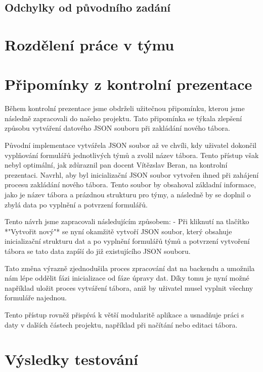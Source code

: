 \documentclass[a4paper, 12pt]{article} %
\begin{document}
\subsection{Odchylky od původního zadání}

\section{Rozdělení práce v týmu}

\section{Připomínky z kontrolní prezentace}

Během kontrolní prezentace jsme obdrželi užitečnou připomínku, kterou jsme následně 
zapracovali do našeho projektu. Tato připomínka se týkala zlepšení způsobu vytváření datového 
JSON souboru při zakládání nového tábora. 

Původní implementace vytvářela JSON soubor až ve chvíli, kdy uživatel dokončil vyplňování 
formulářů jednotlivých týmů a zvolil název tábora. Tento přístup však nebyl optimální, jak 
zdůraznil pan docent Vítězslav Beran, na kontrolní prezentaci. Navrhl, aby byl 
inicializační JSON soubor vytvořen ihned při zahájení procesu zakládání nového tábora. 
Tento soubor by obsahoval základní informace, jako je název tábora a prázdnou strukturu 
pro týmy, a následně by se doplnil o zbylá data po vyplnění a potvrzení formulářů.

Tento návrh jsme zapracovali následujícím způsobem:
- Při kliknutí na tlačítko *"Vytvořit nový"* se nyní okamžitě vytvoří
JSON soubor, který obsahuje inicializační strukturu dat a po vyplnění formulářů týmů a 
potvrzení vytvoření tábora se tato data zapíší do již existujícího JSON souboru.

Tato změna výrazně zjednodušila proces zpracování dat na backendu a umožnila nám lépe oddělit fázi inicializace od fáze úpravy dat. Díky tomu je nyní možné například uložit proces vytváření tábora, aniž by uživatel musel vyplnit všechny formuláře najednou.

Tento přístup rovněž přispívá k větší modularitě aplikace a usnadňuje práci s daty v dalších částech projektu, například při načítání nebo editaci tábora.


\section{Výsledky testování}
\end{document}
